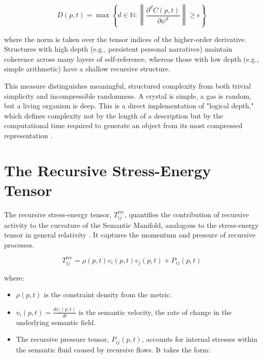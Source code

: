 \begin{equation}
D(p, t) = \max \left\{ d \in \mathbb{N} : \left\| \frac{\partial^d C(p,t)}{\partial \psi^d} \right\| \geq \epsilon \right\}
\end{equation}

where the norm is taken over the tensor indices of the higher-order derivative. Structures with high depth (e.g., persistent personal narratives) maintain coherence across many layers of self-reference, whereas those with low depth (e.g., simple arithmetic) have a shallow recursive structure.

This measure distinguishes meaningful, structured complexity from both trivial simplicity and incompressible randomness. A crystal is simple, a gas is random, but a living organism is deep. This is a direct implementation of "logical depth," which defines complexity not by the length of a description but by the computational time required to generate an object from its most compressed representation \autocite{Bennett1988}.


\section{The Recursive Stress-Energy Tensor}
\label{sec:the_recursive_stress_energy_tensor}

The recursive stress-energy tensor, \(T_{ij}^{\text{rec}}\), quantifies the contribution of recursive activity to the curvature of the Semantic Manifold, analogous to the stress-energy tensor in general relativity \autocite{Einstein1915}. It captures the momentum and pressure of recursive processes.

\begin{equation}
T_{ij}^{\text{rec}} = \rho(p,t) v_i(p,t) v_j(p,t) + P_{ij}(p,t)
\end{equation}

where:

\begin{itemize}

    \item \(\rho(p,t)\) is the constraint density from the metric.
    
    \item \(v_i(p,t) = \frac{d\psi_i(p,t)}{dt}\) is the semantic velocity, the rate of change in the underlying semantic field.
    
    \item The recursive pressure tensor, \(P_{ij}(p,t)\), accounts for internal stresses within the semantic fluid caused by recursive flows. It takes the form:
    
\end{itemize}

